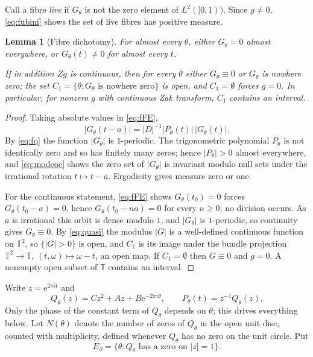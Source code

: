 \documentclass[11pt]{amsart}
\newtheorem{lemma}[theorem]{Lemma}
\theoremstyle{remark}
\newcommand{\T}{\mathbb T}
\newcommand{\e}{\mathrm e}
\begin{document}
Call a fibre \emph{live} if $G_\theta$ is not the zero element of $L^2([0,1))$. Since
$g\neq0$, \eqref{eq:fubini} shows the set of live fibres has positive measure.

\begin{lemma}[Fibre dichotomy]\label{lem:dich}
For almost every $\theta$, either $G_\theta=0$ almost everywhere, or $G_\theta(t)\neq0$ for
almost every $t$.

If in addition $Zg$ is continuous, then for every $\theta$ either $G_\theta\equiv0$ or
$G_\theta$ is nowhere zero; the set $C_1=\{\theta:G_\theta\text{ is nowhere zero}\}$ is open,
and $C_1=\emptyset$ forces $g=0$. In particular, for nonzero $g$ with continuous Zak
transform, $C_1$ contains an interval.
\end{lemma}

\begin{proof}
Taking absolute values in \eqref{eq:fFE},
\begin{equation}\label{eq:modcoc}
|G_\theta(t-a)|=|D|^{-1}|P_\theta(t)|\,|G_\theta(t)| .
\end{equation}
By \eqref{eq:fq} the function $|G_\theta|$ is $1$-periodic. The trigonometric polynomial
$P_\theta$ is not identically zero and so has finitely many zeros; hence $|P_\theta|>0$ almost
everywhere, and \eqref{eq:modcoc} shows the zero set of $|G_\theta|$ is invariant modulo null
sets under the irrational rotation $t\mapsto t-a$. Ergodicity gives measure zero or one.

For the continuous statement, \eqref{eq:fFE} shows $G_\theta(t_0)=0$ forces
$G_\theta(t_0-a)=0$, hence $G_\theta(t_0-na)=0$ for every $n\geq0$; no division occurs. As $a$
is irrational this orbit is dense modulo $1$, and $|G_\theta|$ is $1$-periodic, so continuity
gives $G_\theta\equiv0$. By \eqref{eq:quasi} the modulus $|G|$ is a well-defined continuous
function on $\T^2$, so $\{|G|>0\}$ is open, and $C_1$ is its image under the bundle projection
$\T^2\to\T$, $(t,\omega)\mapsto\omega-t$, an open map. If $C_1=\emptyset$ then $G\equiv0$ and
$g=0$. A nonempty open subset of $\T$ contains an interval.
\end{proof}

Write $z=\e^{2\pi it}$ and
\begin{equation}\label{eq:Q}
Q_\theta(z)=Cz^2+Az+B\e^{-2\pi i\theta},\qquad P_\theta(t)=z^{-1}Q_\theta(z).
\end{equation}
Only the phase of the constant term of $Q_\theta$ depends on $\theta$; this drives everything
below. Let $N(\theta)$ denote the number of zeros of $Q_\theta$ in the open unit disc, counted
with multiplicity, defined whenever $Q_\theta$ has no zero on the unit circle. Put
\begin{equation}\label{eq:Ebd}
E_\partial=\{\theta:Q_\theta\text{ has a zero on }|z|=1\}.
\end{equation}
\end{document}
